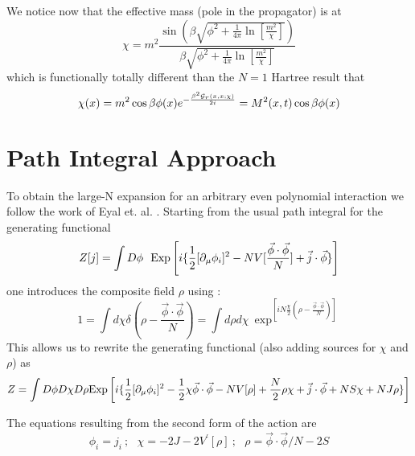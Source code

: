 \documentclass[a4paper,prd,preprint,superscriptaddress,showpacs,byrevtex]{revtex4}
\begin{document}
We notice now that the effective mass (pole in the propagator) is  at
\begin{equation}
\chi=
m^2
\frac {\sin \left( \beta \sqrt{\phi^2+ \frac{1}{4 \pi}
\ln[\frac{m^2}{\chi}]} \right)}{\beta \sqrt{
\phi^2 +\frac{1}{4
\pi}
\ln[\frac{m^2}{\chi}]}}
\end{equation}
which is functionally totally different than the $N=1$ Hartree result that
\begin{equation}
\chi(x) = m^2 \cos \beta \phi(x) e^{-\frac{\beta^2 {\cal G}_r(x,x;\chi)}{2i}} = M^2
(x,t) \cos \beta \phi(x) \end{equation}

 \section{Path Integral Approach}

To obtain the large-N expansion for an arbitrary even polynomial interaction
we follow the work of Eyal et. al.
\cite{ref:Eyal}.  Starting from the usual path integral for the generating
functional
\begin{equation}
Z[j] = \int D \phi~~{\rm Exp} \left[ i \{ \frac{1}{2 }[\partial_\mu
\phi_i]^2 - N
V[\frac{\vec \phi \cdot \vec \phi}{N}] +\vec j \cdot \vec \phi \} \right] \end{equation}
one introduces the composite field $\rho$ using :
\begin{equation}
  1= \int d\chi \delta( \rho- \frac{\vec \phi \cdot \vec \phi}{N}) = \int
d\rho
 d \chi ~\exp^{ \left[ i N \frac{\chi}{2} (\rho - \frac{\vec \phi \cdot \vec
\phi}{N}) \right]} \end{equation} This allows us to rewrite the generating
functional (also adding sources for $\chi$ and $\rho$)  as
\begin{equation}
Z = \int D \phi D\chi D \rho{\rm Exp} \left[ i \{  \frac{1}{2} [
\partial_\mu \phi_i ]^2-
\frac{1}{2} \chi {\vec \phi \cdot \vec \phi}- N V[{\rho}] +
\frac{N}{2} \rho \chi +\vec j \cdot \vec \phi + N S \chi + N J
\rho  \} \right] \end{equation}

The equations resulting from the second form of the action are
\begin{equation}
[\Box + \chi] \phi_i = j_i~; ~~~\chi= -2J - 2 V^\prime[\rho]~; ~~~\rho =
\vec \phi \cdot \vec \phi/N - 2 S
\end{equation}
\end{document}

